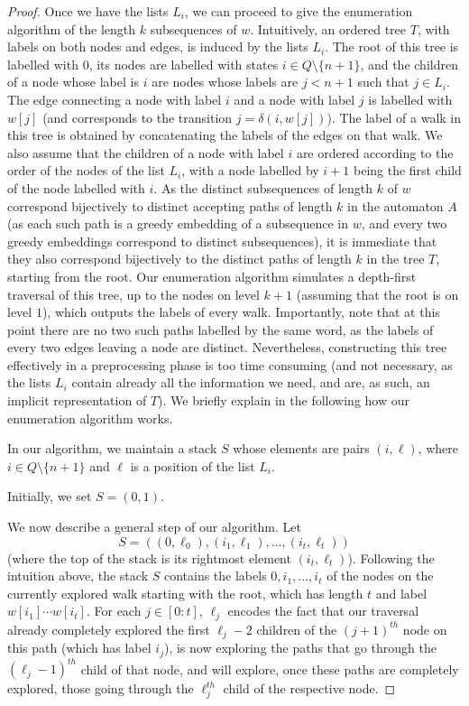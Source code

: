 \documentclass[runningheads,UKenglish,cleveref, autoref, thm-restate]{llncs}
\begin{document}
\begin{proof}
Once we have the lists $L_i$, we can proceed to give the enumeration algorithm of the length $k$ subsequences of $w$. Intuitively, an ordered tree $T$, with labels on both nodes and edges, is induced by the lists $L_i$. The root of this tree is labelled with $0$, its nodes are labelled with states $i\in Q\setminus \{n+1\}$, and the children of a node whose label is $i$ are nodes whose labels are $j< n+1$ such that $j\in L_i$. The edge connecting a node with label $i$ and a node with label $j$ is labelled with $w[j]$ (and corresponds to the transition $j=\delta(i,w[j])$). The label of a walk in this tree is obtained by concatenating the labels of the edges on that walk. We also assume that the children of a node with label $i$ are ordered according to the order of the nodes of the list $L_i$, with a node labelled by $i+1$ being the first child of the node labelled with $i$. As the distinct subsequences of length $k$ of $w$ correspond bijectively to distinct accepting paths of length $k$ in the automaton $A$ (as each such path is a greedy embedding of a subsequence in $w$, and every two greedy embeddings correspond to distinct subsequences), it is immediate that they also correspond bijectively to the distinct paths of length $k$ in the tree $T$, starting from the root. Our enumeration algorithm simulates a depth-first traversal of this tree, up to the nodes on level $k+1$ (assuming that the root is on level $1$), which outputs the labels of every walk. Importantly, note that at this point there are no two such paths labelled by the same word, as the labels of every two edges leaving a node are distinct. Nevertheless, constructing this tree effectively in a preprocessing phase is too time consuming (and not necessary, as the lists $L_i$ contain already all the information we need, and are, as such, an implicit representation of $T$). We briefly explain in the following how our enumeration algorithm works. 

In our algorithm, we maintain a stack $S$ whose elements are pairs $(i,\ell)$, where $i\in Q\setminus \{n+1\}$ and $\ell$ is a position of the list $L_i$.

Initially, we set $S=(0,1)$. 

We now describe a general step of our algorithm. Let 
\[
S=((0,\ell_0), (i_1, \ell_1), \ldots, (i_t, \ell_t))
\]
(where the top of the stack is its rightmost element $(i_t, \ell_t)$). Following the intuition above, the stack $S$ contains the labels $0,i_1,\ldots,i_t$ of the nodes on the currently explored walk starting with the root, which has length $t$ and label $w[i_1]\cdots w[i_t]$. For each $j\in [0:t]$, $\ell_j$ encodes the fact that our traversal already completely explored the first $\ell_j-2$ children of the $(j+1)^{th}$ node on this path (which has label $i_j$), is now exploring the paths that go through the $(\ell_j-1)^{th}$ child of that node, and will explore, once these paths are completely explored, those going through the $\ell_j^{th}$ child of the respective node. 


\end{proof}
\end{document}
